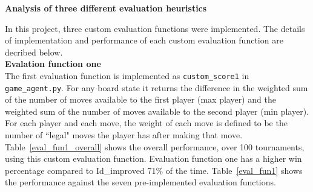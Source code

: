 \documentclass[11pt]{article}
\begin{document}
\begin{center}
{\bf Analysis of three different evaluation heuristics }\\
\end{center}
In this project, three custom evaluation functions were implemented. The details of implementation and performance of each custom evaluation function are decribed 
below.\\

{\bf Evalation function one}\\
The first evaluation function is implemented as \texttt{custom\_score1} in \texttt{game\_agent.py}. For any board state it returns the difference in the weighted sum of the number of moves available to the first player (max player) and the weighted sum of the number of moves available to the second player (min player). For each player and each move, the weight of each move is defined to be the number of ``legal" moves the player has after making that move.\\

Table~\ref{eval_fun1_overall} shows the overall performance, over 100 tournaments, using this custom evaluation function. Evaluation function one has a higher win percentage compared to Id\_improved 71\% of the time. Table~\ref{eval_fun1} shows the performance against the seven pre-implemented evaluation functions. 
\end{document}

